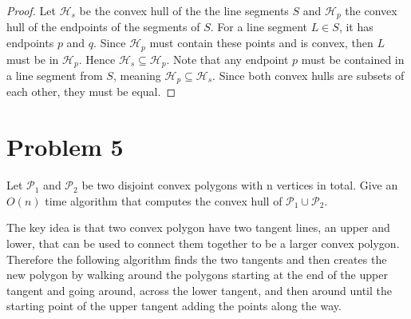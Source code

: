 \documentclass{eeleyes}
\begin{document}
\begin{proof}
    Let $\mathcal{H}_s$ be the convex hull of the the line segments $S$ and $\mathcal{H}_p$ the convex hull of the endpoints of the segments of $S$. For a line segment $L \in S$, it has endpoints $p$ and $q$. Since $\mathcal{H}_p$ must contain these points and is convex, then $L$ must be in $\mathcal{H}_p$. Hence $\mathcal{H}_s \subseteq \mathcal{H}_p$. Note that any endpoint $p$ must be contained in a line segment from $S$, meaning $\mathcal{H}_p \subseteq \mathcal{H}_s$. Since both convex hulls are subsets of each other, they must be equal.
\end{proof}

\section*{Problem 5}

\begin{problem}
    Let $\mathcal{P}_1$ and $\mathcal{P}_2$ be two disjoint convex polygons with n vertices in total. Give an $O(n)$ time algorithm that computes the convex hull of $\mathcal{P}_1 \cup \mathcal{P}_2$.
\end{problem}

The key idea is that two convex polygon have two tangent lines, an upper and lower, that can be used to connect them together to be a larger convex polygon. Therefore the following algorithm finds the two tangents and then creates the new polygon by walking around the polygons starting at the end of the upper tangent and going around, across the lower tangent, and then around until the starting point of the upper tangent adding the points along the way.

\algnewcommand{}
\algnewcommand{}
\algnewcommand\Input{\item[\algorithmicin]}
\algnewcommand\Output{\item[\algorithmicout]}
\end{document}
